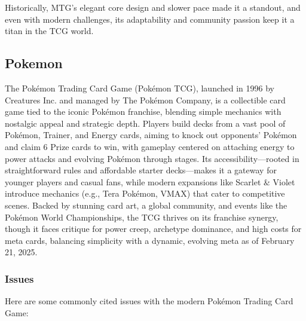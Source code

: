 Historically, MTG’s elegant core design and slower pace made it a standout, and even with modern challenges, its adaptability and community passion keep it a titan in the TCG world.












\subsection{Pokemon}

The Pokémon Trading Card Game (Pokémon TCG), launched in 1996 by Creatures Inc. and managed by The Pokémon Company, is a collectible card game tied to the iconic Pokémon franchise, blending simple mechanics with nostalgic appeal and strategic depth. Players build decks from a vast pool of Pokémon, Trainer, and Energy cards, aiming to knock out opponents’ Pokémon and claim 6 Prize cards to win, with gameplay centered on attaching energy to power attacks and evolving Pokémon through stages. Its accessibility—rooted in straightforward rules and affordable starter decks—makes it a gateway for younger players and casual fans, while modern expansions like Scarlet \& Violet introduce mechanics (e.g., Tera Pokémon, VMAX) that cater to competitive scenes. Backed by stunning card art, a global community, and events like the Pokémon World Championships, the TCG thrives on its franchise synergy, though it faces critique for power creep, archetype dominance, and high costs for meta cards, balancing simplicity with a dynamic, evolving meta as of February 21, 2025.

\subsubsection{Issues}

Here are some commonly cited issues with the modern Pokémon Trading Card Game:

